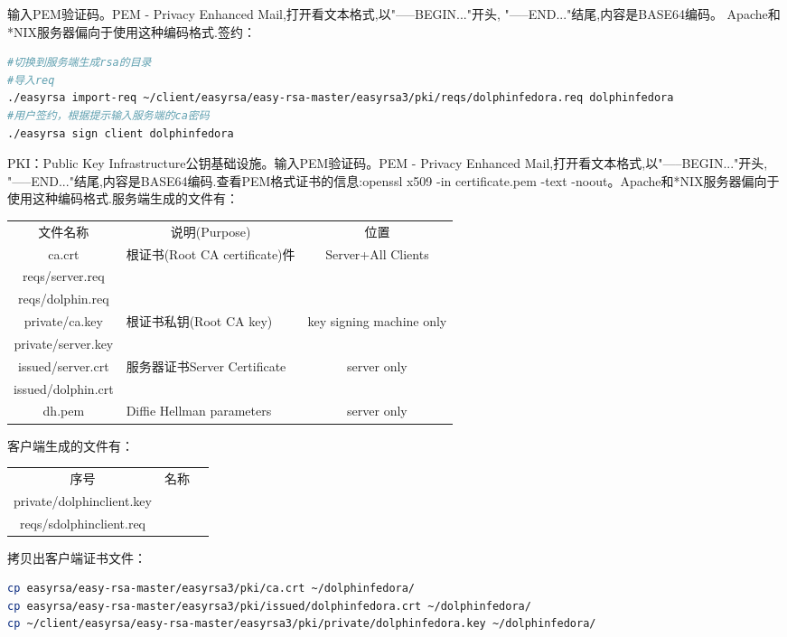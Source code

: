 \documentclass[letter]{book}
\begin{document}
输入PEM验证码。PEM - Privacy Enhanced Mail,打开看文本格式,以"-----BEGIN..."开头, "-----END..."结尾,内容是BASE64编码。
Apache和*NIX服务器偏向于使用这种编码格式.签约：

\begin{lstlisting}[language=Bash]
#切换到服务端生成rsa的目录
#导入req
./easyrsa import-req ~/client/easyrsa/easy-rsa-master/easyrsa3/pki/reqs/dolphinfedora.req dolphinfedora
#用户签约，根据提示输入服务端的ca密码
./easyrsa sign client dolphinfedora
\end{lstlisting}

PKI：Public Key Infrastructure公钥基础设施。输入PEM验证码。PEM - Privacy Enhanced Mail,打开看文本格式,以"-----BEGIN..."开头, "-----END..."结尾,内容是BASE64编码.查看PEM格式证书的信息:openssl x509 -in certificate.pem -text -noout。Apache和*NIX服务器偏向于使用这种编码格式.服务端生成的文件有：

\begin{tabular}{|c|p{5cm}|c|}
	\hline
	\multirow{1}{*}{文件名称}
	& \multicolumn{1}{c|}{说明(Purpose)} 
	& \multicolumn{1}{c|}{位置} \\			
	\cline{1-3}
	ca.crt  & 根证书(Root CA certificate)件 & Server+All Clients	\\
	\hline
	reqs/server.req  & &\\
	\hline
	reqs/dolphin.req  & &\\
	\hline
	private/ca.key & 根证书私钥(Root CA key) & key signing machine only\\
	\hline
	private/server.key && \\
	\hline
	issued/server.crt & 服务器证书Server Certificate & server only\\
	\hline
	issued/dolphin.crt && \\
	\hline
	dh.pem & Diffie Hellman parameters & server only \\
	\hline
\end{tabular}

客户端生成的文件有：

\begin{tabular}{|c|p{8cm}|c|}
	\hline
	\multirow{1}{*}{序号}
	& \multicolumn{1}{c|}{名称}  \\			
	\cline{1-2}
	private/dolphinclient.key  & \\
	\hline
	reqs/sdolphinclient.req & \\
	\hline
\end{tabular}

拷贝出客户端证书文件：

\begin{lstlisting}[language=Bash]
cp easyrsa/easy-rsa-master/easyrsa3/pki/ca.crt ~/dolphinfedora/
cp easyrsa/easy-rsa-master/easyrsa3/pki/issued/dolphinfedora.crt ~/dolphinfedora/
cp ~/client/easyrsa/easy-rsa-master/easyrsa3/pki/private/dolphinfedora.key ~/dolphinfedora/
\end{lstlisting}
\end{document}
